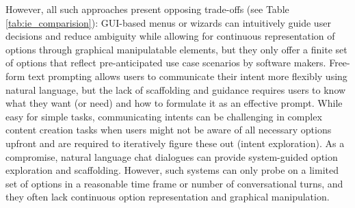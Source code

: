 However, all such approaches present opposing trade-offs (see Table \ref{tab:ie_comparision}): 
GUI-based menus or wizards can intuitively guide user decisions and reduce ambiguity while allowing for continuous representation of options through graphical manipulatable elements, but they only offer a finite set of options that reflect pre-anticipated use case scenarios by software makers. 
Free-form text prompting allows users to communicate their intent more flexibly using natural language, but the lack of scaffolding and guidance requires users to know what they want (or need) and how to formulate it as an effective prompt.
While easy for simple tasks, communicating intents can be challenging in complex content creation tasks when users might not be aware of all necessary options upfront and are required to iteratively figure these out (intent exploration). 
As a compromise, natural language chat dialogues can provide system-guided option exploration and scaffolding. 
However, such systems can only probe on a limited set of options in a reasonable time frame or number of conversational turns, and they often lack continuous option representation and graphical manipulation. 

